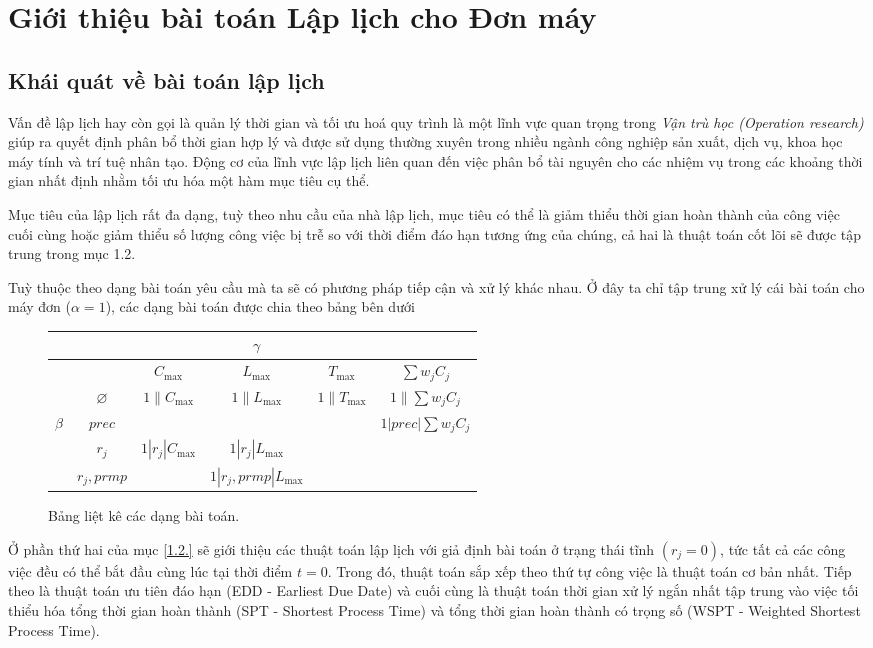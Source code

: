 \documentclass[12pt,a4paper]{report}
\begin{document}
\chapter{Giới thiệu bài toán Lập lịch cho Đơn máy}
\section{Khái quát về bài toán lập lịch}
Vấn đề lập lịch hay còn gọi là quản lý thời gian và tối ưu hoá quy trình là một lĩnh vực quan trọng trong \textit{Vận trù học (Operation research)} giúp ra quyết định phân bổ thời gian hợp lý và được sử dụng thường xuyên trong nhiều ngành công nghiệp sản xuất, dịch vụ, khoa học máy tính và trí tuệ nhân tạo. Động cơ của lĩnh vực lập lịch liên quan đến việc phân bổ tài nguyên cho các nhiệm vụ trong các khoảng thời gian nhất định nhằm tối ưu hóa một hàm mục tiêu cụ thể.

Mục tiêu của lập lịch rất đa dạng, tuỳ theo nhu cầu của nhà lập lịch, mục tiêu có thể là giảm thiểu thời gian hoàn thành của công việc cuối cùng hoặc giảm thiểu số lượng công việc bị trễ so với thời điểm đáo hạn tương ứng của chúng, cả hai là thuật toán cốt lõi sẽ được tập trung trong mục 1.2.

Tuỳ thuộc theo dạng bài toán yêu cầu mà ta sẽ có phương pháp tiếp cận và xử lý khác nhau. Ở đây ta chỉ tập trung xử lý cái bài toán cho máy đơn ($\alpha = 1$), các dạng bài toán được chia theo bảng bên dưới
\begin{figure}[h!]
	\centering
	\begin{tabular}{| c || c| c c c c |} 
	\hline
	&&& $\gamma$ && \\
	\hline\hline
	&& $C_{\max}$ & $L_{\max}$ & $T_{\max}$ & $\sum w_j C_j$ \\
	\hline
	& $\varnothing$ & $1\|C_{\max}$ & $1\|L_{\max}$ & $1\|T_{\max}$ & $1\|\sum w_j C_j$ \\
	$\beta$ & $prec$ & \phantom{} & $\phantom{}$&$\phantom{}$ & $1|prec|\sum w_j C_j$ \\
	& $r_j$ & $1|r_j|C_{\max}$ &$1|r_j|L_{\max}$ &$\phantom{}$ &$\phantom{}$ \\
	& $r_j, prmp$ & \phantom{} &$1|r_j, prmp|L_{\max}$&$\phantom{}$&$\phantom{}$ \\
	\hline
	\end{tabular}
	\caption{Bảng liệt kê các dạng bài toán.}
\end{figure}

 Ở phần thứ hai của mục \eqref{1.2.} sẽ giới thiệu các thuật toán lập lịch với giả định bài toán ở trạng thái tĩnh $(r_j = 0)$, tức tất cả các công việc đều có thể bắt đầu cùng lúc tại thời điểm $t = 0$. Trong đó, thuật toán sắp xếp theo thứ tự công việc là thuật toán cơ bản nhất. Tiếp theo là thuật toán ưu tiên đáo hạn (EDD - Earliest Due Date) và cuối cùng là thuật toán thời gian xử lý ngắn nhất tập trung vào việc tối thiểu hóa tổng thời gian hoàn thành (SPT - Shortest Process Time) và tổng thời gian hoàn thành có trọng số (WSPT - Weighted Shortest Process Time).
\end{document}
